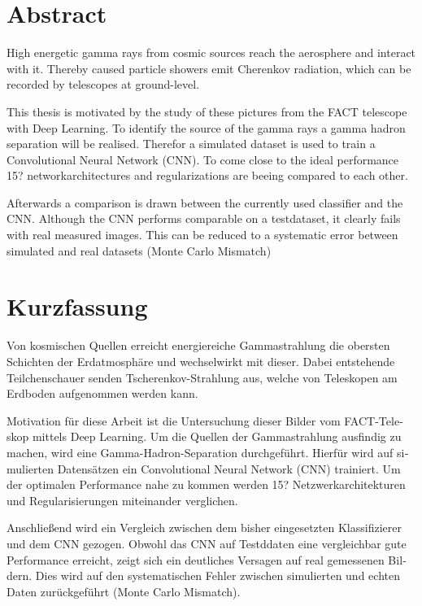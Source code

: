 \thispagestyle{plain}

\section*{Abstract}
High energetic gamma rays from cosmic sources reach the aerosphere and interact with it.
Thereby caused particle showers emit Cherenkov radiation, which can be recorded by telescopes at ground-level.

This thesis is motivated by the study of these pictures from the FACT telescope with Deep Learning.
To identify the source of the gamma rays a gamma hadron separation will be realised.
Therefor a simulated dataset is used to train a Convolutional Neural Network (CNN).
To come close to the ideal performance 15? networkarchitectures and regularizations are beeing compared to each other.

Afterwards a comparison is drawn between the currently used classifier and the CNN.
Although the CNN performs comparable on a testdataset, it clearly fails with real measured images.
This can be reduced to a systematic error between simulated and real datasets (Monte Carlo Mismatch)

\section*{Kurzfassung}
\begin{german}
Von kosmischen Quellen erreicht energiereiche Gammastrahlung die obersten Schichten der Erdatmosphäre und wechselwirkt mit dieser.
Dabei entstehende Teilchenschauer senden Tscherenkov-Strahlung aus, welche von Teleskopen am Erdboden aufgenommen werden kann.

Motivation für diese Arbeit ist die Untersuchung dieser Bilder vom FACT-Teleskop mittels Deep Learning.
Um die Quellen der Gammastrahlung ausfindig zu machen, wird eine Gamma-Hadron-Separation durchgeführt.
Hierfür wird auf simulierten Datensätzen ein Convolutional Neural Network (CNN) trainiert.
Um der optimalen Performance nahe zu kommen werden 15? Netzwerkarchitekturen und Regularisierungen miteinander verglichen.

Anschließend wird ein Vergleich zwischen dem bisher eingesetzten Klassifizierer und dem CNN gezogen.
Obwohl das CNN auf Testddaten eine vergleichbar gute Performance erreicht, zeigt sich ein deutliches Versagen auf real gemessenen Bildern.
Dies wird auf den systematischen Fehler zwischen simulierten und echten Daten zurückgeführt (Monte Carlo Mismatch).
\end{german}
